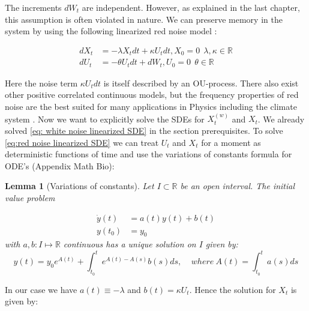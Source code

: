 \documentclass[%
thesis=student,%
coverpage=false,%
titlepage=false,%
headmarks=true, %
english,%
font=libertine, %
math=newpxtx, %
BCOR=5mm,%
coverBCOR=11mm%
]{tumbook}
\newtheorem{lemma}{Lemma}
\begin{document}
The increments $dW_{t}$ are independent. However, as explained in the last chapter, this assumption is often violated in nature. We can preserve memory in the system by using the following linearized red noise model \cite{Hanggi:1994,Morr:2022}:

\begin{subequations}
    \begin{align}
        dX_{t} &= -\lambda X_{t}dt + \kappa U_{t}dt, X_{0} = 0 \label{eq: 3.2a} \ \ \lambda,\kappa \in \mathbb{R}  \\ 
        dU_{t} &= -\theta U_{t}dt + dW_{t}, U_{0} = 0 \label{eq: 3.2b} \ \ \theta \in \mathbb{R}
    \end{align}
    \label{eq:red noise linearized SDE}
\end{subequations}

Here the noise term $\kappa U_{t}dt$ is itself described by an OU-process. There also exist other positive correlated continuous models, but the frequency properties of red noise are the best suited for many applications in Physics including the climate system \cite{Hasselmann:1976, Hanggi:1993, Liao:2022}. 
Now we want to explicitly solve the SDEs for $X_{t}^{(w)}$ and $X_{t}$. We already solved \eqref{eq: white noise linearized SDE} in the section prerequisites. To solve \eqref{eq:red noise linearized SDE} we can treat $U_{t}$ and $X_{t}$ for a moment as deterministic functions of time and use the variations of constants formula for ODE's (Appendix Math Bio): \\

\begin{lemma}[Variations of constants]
    Let $I \subset \mathbb{R}$ be an open interval. The initial value problem
        
    \begin{subequations}
        \begin{align}
            \dot{y}(t) &= a(t)y(t) + b(t)  \\
            y(t_{0}) &= y_{0}
        \end{align}
    \end{subequations}
    with $a,b : I \mapsto \mathbb{R}$ continuous has a unique solution on $I$ given by:
    \[
    y(t) = y_{0}e^{A(t)} + \int_{t_{0}}^{t}e^{A(t)-A(s)}b(s)ds, \ \ \ \ \ where \ A(t) = \int_{t_{0}}^{t}a(s)ds
    \]
\end{lemma}
In our case we have $a(t) \equiv -\lambda$ and $b(t) = \kappa U_{t}$. Hence the solution for $X_{t}$ is given by:
\end{document}
